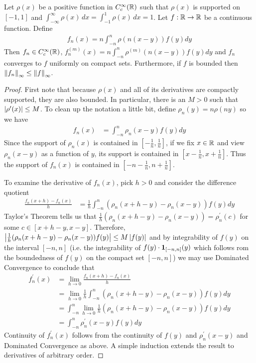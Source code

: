 \begin{lem}\label{ApproximationByMollifiers}Let $\rho(x)$ be a positive
  function in $C^\infty_c(\mathbb{R})$ such
  that $\rho(x)$ is supported on $[-1,1]$ and $\int_{-\infty}^\infty
  \rho(x) \, dx = \int_{-1}^1
  \rho(x) \, dx= 1$.  Let $f : \mathbb{R} \to \mathbb{R}$ be a continuous function.  Define 
\begin{align*}
f_n(x) = n \int_{-n}^n \rho(n(x - y)) f(y) dy
\end{align*}
Then $f_n \in C_c^\infty(\mathbb{R})$, $f_n^{(m)}(x) = n \int_{-n}^n
\rho^{(m)}(n(x -y)) f(y) dy$ and $f_n$ converges to $f$ uniformly on
compact sets.  Furthermore, if $f$ is bounded then $\left \lVert f_n \right \rVert_\infty \leq
\left \lVert f \right \rVert_\infty$.
\end{lem}
\begin{proof}
First note that because $\rho(x)$ and all of its derivatives are
compactly supported, they are also bounded.  In particular, there is
an $M > 0$ such that $\left \vert \rho^\prime(x) \right \vert \leq M$.  To clean up the notation
a little bit, define $\rho_n(y) = n\rho(ny)$ so we have
\begin{align*}
f_n(x) &= \int_{-n}^{n} \rho_n(x - y) f(y) dy
\end{align*}
Since the support of $\rho_n(x)$ is contained in
$[-\frac{1}{n},\frac{1}{n}]$, if we fix $x \in \mathbb{R}$ and
view $\rho_n(x - y)$ as a  function of $y$, its support is
contained in $[x-\frac{1}{n},x+\frac{1}{n}]$.  Thus the support of
$f_n(x)$ is contained in  $[-n-\frac{1}{n},n+\frac{1}{n}]$.

To examine the derivative
of $f_n(x)$, pick $h > 0$ and consider the difference
quotient
\begin{align*}
\frac{f_n(x + h) - f_n(x)}{h} &= \frac{1}{h} \int_{-n}^{n}
(\rho_n(x+h - y) - \rho_n(x - y) ) f(y) dy
\end{align*}
Taylor's Theorem tells us that $\frac{1}{h}(\rho_n(x+h - y) - \rho_n(x - y)) =
\rho_n^\prime(c)$ for some $c \in [x+h - y, x - y]$.  Therefore,
$\left \vert \frac{1}{h} (\rho_n(x+h - y) - \rho_n(x - y))f(y) \right \vert \leq M\left \vert f(y) \right \vert$ and by
integrability of $f(y)$ on the interval $[-n,n]$ (i.e. the
integrability of $f(y) \cdot \textbf{1}_{[-n,n]}(y)$ which follows
rom the boundedness of $f(y)$ on the compact set $[-n,n]$) we may use Dominated Convergence to conclude
that 
\begin{align*}
f_n^\prime(x) &=\lim_{h \to 0} \frac{f_n(x + h) - f_n(x)}{h} \\
&= \lim_{h \to 0} \frac{1}{h} \int_{-n}^{n}
(\rho_n(x+h - y) - \rho_n(x - y) ) f(y) dy \\
&= \int_{-n}^{n }
\lim_{h \to 0} \frac{1}{h} (\rho_n(x+h - y) - \rho_n(x - y) ) f(y) dy
\\
&= \int_{-n}^{n} \rho^\prime_n(x - y) f(y) dy 
\end{align*} 
Continuity of $f_n^\prime(x)$ follows from the continuity of $f(y)$
and $\rho^\prime_n(x - y) $ and Dominated Convergence as above.  A simple induction extends the result to derivatives of arbitrary
order.


\end{proof}
